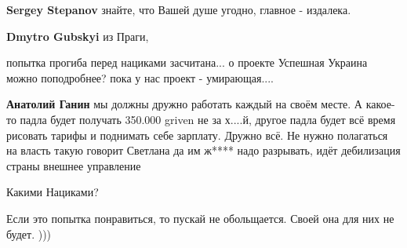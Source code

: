 \begin{itemize}
\begin{itemize}
 
\textbf{Sergey Stepanov} знайте, что Вашей душе угодно, главное - издалека.

 
\textbf{Dmytro Gubskyi} из Праги,
\end{itemize}

 
попытка прогиба перед нациками засчитана... о проекте Успешная Украина можно
поподробнее? пока у нас проект - умирающая....

\begin{itemize}
 
\textbf{Анатолий Ганин} мы должны дружно работать каждый на своём месте. А какое-то падла будет получать 350.000 griven не за х....й, другое падла будет всё время рисовать тарифы и поднимать себе зарплату. Дружно всё. Не нужно полагаться на власть такую говорит Светлана да им ж**** надо разрывать, идёт дебилизация страны внешнее управление

 
Какими Нациками?

 
Если это попытка понравиться, то пускай не обольщается. Своей она для них не будет. )))


\end{itemize}
\end{itemize}
